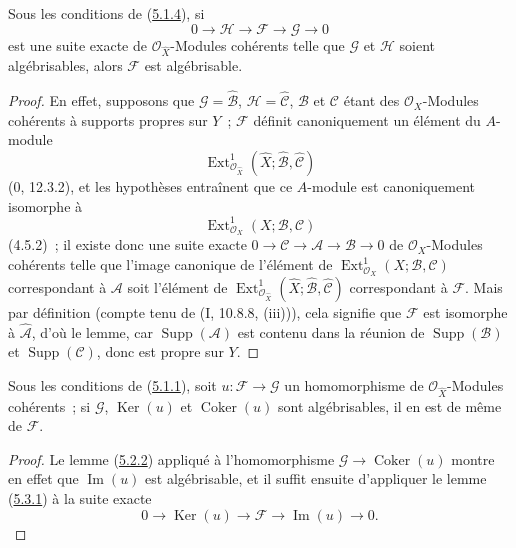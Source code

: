 \begin{lemma}[5.3.1]
\label{III.5.3.1-fr}
Sous les conditions de (\hyperref[III.5.1.4-fr]{5.1.4}), si
\[
0\to\mathcal H\to\mathcal F\to\mathcal G\to0
\]
est une suite exacte de $\mathcal O_{\widehat X}$-Modules cohérents telle que
$\mathcal G$ et $\mathcal H$ soient algébrisables, alors $\mathcal F$ est
algébrisable.
\end{lemma}

\begin{proof}
En effet, supposons que $\mathcal G=\widehat{\mathcal B}$,
$\mathcal H=\widehat{\mathcal C}$, $\mathcal B$ et $\mathcal C$ étant des
$\mathcal O_X$-Modules cohérents à supports propres sur $Y$~; $\mathcal F$ définit
canoniquement un élément du $A$-module
\[
\operatorname{Ext}^1_{\mathcal O_{\widehat X}}
(\widehat X;\widehat{\mathcal B},\widehat{\mathcal C})
\]
($0$, 12.3.2), et les hypothèses entraînent que ce $A$-module est canoniquement
isomorphe à
\[
\operatorname{Ext}^1_{\mathcal O_X}(X;\mathcal B,\mathcal C)
\]
(4.5.2)~; il existe donc une suite exacte
$0\to\mathcal C\to\mathcal A\to\mathcal B\to0$ de $\mathcal O_X$-Modules
cohérents telle que l'image canonique de l'élément de
$\operatorname{Ext}^1_{\mathcal O_X}(X;\mathcal B,\mathcal C)$ correspondant à
$\mathcal A$ soit l'élément de
$\operatorname{Ext}^1_{\mathcal O_{\widehat X}}
(\widehat X;\widehat{\mathcal B},\widehat{\mathcal C})$ correspondant à
$\mathcal F$. Mais par définition (compte tenu de (I, 10.8.8, (iii))), cela signifie
que $\mathcal F$ est isomorphe à $\widehat{\mathcal A}$, d'où le lemme, car
$\operatorname{Supp}(\mathcal A)$ est contenu dans la réunion de
$\operatorname{Supp}(\mathcal B)$ et $\operatorname{Supp}(\mathcal C)$, donc est
propre sur $Y$.
\end{proof}

\begin{corollary}[5.3.2]
\label{III.5.3.2-fr}
Sous les conditions de (\hyperref[III.5.1.1-fr]{5.1.1}), soit
$u:\mathcal F\to\mathcal G$ un homomorphisme de
$\mathcal O_{\widehat X}$-Modules cohérents~; si $\mathcal G$,
$\operatorname{Ker}(u)$ et $\operatorname{Coker}(u)$ sont algébrisables, il en est
de même de $\mathcal F$.
\end{corollary}

\begin{proof}
Le lemme (\hyperref[III.5.2.2-fr]{5.2.2}) appliqué à l'homomorphisme
$\mathcal G\to\operatorname{Coker}(u)$ montre en effet que
$\operatorname{Im}(u)$ est algébrisable, et il suffit ensuite d'appliquer le lemme
(\hyperref[III.5.3.1-fr]{5.3.1}) à la suite exacte
\[
0\to\operatorname{Ker}(u)\to\mathcal F\to\operatorname{Im}(u)\to0.
\]
\end{proof}


